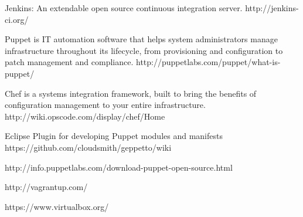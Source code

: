 \documentclass{article}
\begin{document}
\begin{thebibliography}{10}

	Jenkins: An extendable open source continuous integration server.
  	http://jenkins-ci.org/

  	Puppet is IT automation software that helps system administrators manage infrastructure throughout its lifecycle, 
  from provisioning and configuration to patch management and compliance.
  	http://puppetlabs.com/puppet/what-is-puppet/
  
 	Chef is a systems integration framework, built to bring the benefits of configuration management to your entire infrastructure.
  	http://wiki.opscode.com/display/chef/Home

	Eclipse Plugin for developing Puppet modules and manifests
	https://github.com/cloudsmith/geppetto/wiki

	http://info.puppetlabs.com/download-puppet-open-source.html

	http://vagrantup.com/
	
	https://www.virtualbox.org/	
		  
\end{thebibliography}
\end{document}
